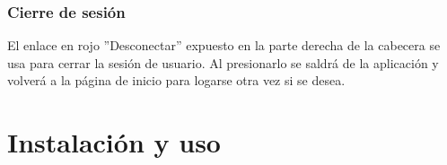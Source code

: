 \documentclass[a4paper, 12pt]{book}
\begin{document}
\subsection{Cierre de sesi\'on}
El enlace en rojo ''Desconectar'' expuesto en la parte derecha de la cabecera se usa para cerrar la sesi\'on de usuario. Al presionarlo se saldr\'a de la 
aplicaci\'on y volver\'a a la p\'agina de inicio para logarse otra vez si se desea.
\cleardoublepage
\chapter{Instalaci\'on y uso}
\label{app:instalacionuso}



\cleardoublepage


\end{document}
